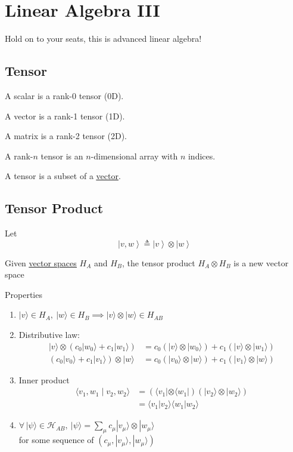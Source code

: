 \documentclass[
]{article}
\let\oldhyperref\hyperref
\renewcommand{\hyperref}[2][]{\oldhyperref[#1]{\underline{#2}}}
\providecommand{\ket}[1]{\left\lvert #1 \right\rangle}
\begin{document}
\section{Linear Algebra III}\label{linear-algebra-iii}
Hold on to your seats, this is advanced linear algebra!
\subsection{Tensor}\label{tensor}
A scalar is a rank-0 tensor (0D).

A vector is a rank-1 tensor (1D).

A matrix is a rank-2 tensor (2D).

A rank-$n$ tensor is an $n$-dimensional array with $n$ indices.

A tensor is a subset of a \hyperref[vectors]{vector}.

\subsection{Tensor Product}\label{tensor-product}

Let
\[
	\ket{v, w} \triangleq \ket{v}\otimes\ket{w}
\]

Given \hyperref[vector-spaces]{vector spaces} $H_A$ and $H_B$, the tensor product $H_A\otimes H_B$ is a new vector space

Properties
\begin{enumerate}
	\item $|v\rangle \in {H}_A, \ |w\rangle \in {H}_B \implies |v\rangle \otimes |w\rangle \in {H}_{AB}$

	\item Distributive law:
	      \begin{align*}
		      |v\rangle \otimes (c_0 |w_0\rangle + c_1 |w_1\rangle) & = c_0 (|v\rangle \otimes |w_0\rangle) + c_1 (|v\rangle \otimes |w_1\rangle) \\
		      (c_0 |v_0\rangle + c_1 |v_1\rangle) \otimes |w\rangle & = c_0 (|v_0\rangle \otimes |w\rangle) + c_1 (|v_1\rangle \otimes |w\rangle)
	      \end{align*}

	\item Inner product
	      \begin{align*}
		      \langle v_1, w_1 \mid v_2, w_2 \rangle & = (\langle v_1 | \otimes \langle w_1 |)(|v_2\rangle \otimes |w_2\rangle) \\
		                                             & = \langle v_1 | v_2 \rangle \langle w_1 | w_2 \rangle
	      \end{align*}

	\item $\forall \, |\psi\rangle \in \mathcal{H}_{AB}, \ |\psi\rangle = \sum_{\mu} c_\mu |v_\mu\rangle \otimes |w_\mu\rangle$ \\
	      for some sequence of $(c_\mu, |v_\mu\rangle, |w_\mu\rangle)$
\end{enumerate}
\end{document}
